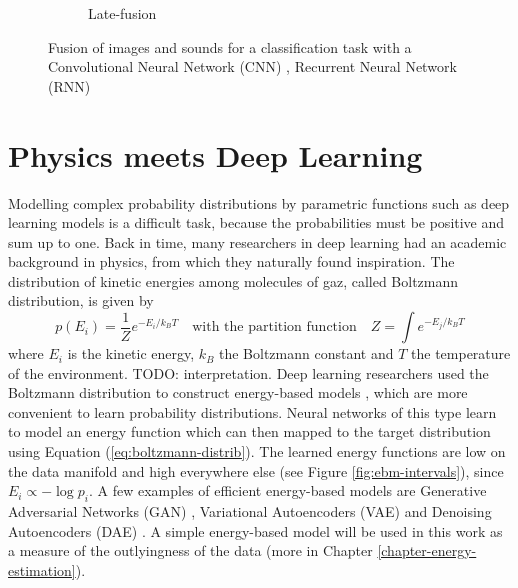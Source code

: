 \begin{figure}[!h]
\begin{subfigure}{.45\textwidth}
  \vspace*{2mm}
  \caption{Late-fusion}
  \label{fig:late-fusion}
\end{subfigure}
\caption[Early and late fusion]{Fusion of images and sounds for a classification task with a Convolutional Neural Network (CNN) \citep{image-recognition}, Recurrent Neural Network (RNN) \citep{machine-translation}}
\label{fig:fusion}
\end{figure}


\section{Physics meets Deep Learning}\label{sec:ebm}
Modelling complex probability distributions by parametric functions such as deep learning models is a difficult task, because the probabilities must be positive and sum up to one. Back in time, many researchers in deep learning had an academic background in physics, from which they naturally found inspiration. The distribution of kinetic energies among molecules of gaz, called Boltzmann distribution, is given by
\begin{equation}
p(E_i) = \frac{1}{Z}e^{-E_i/k_B T} \quad \text{with the partition function} \quad Z = \int e^{-E_j/k_B T}
\label{eq:boltzmann-distrib}
\end{equation}
where $E_i$ is the kinetic energy, $k_B$ the Boltzmann constant and $T$ the temperature of the environment. TODO: interpretation. Deep learning researchers used the Boltzmann distribution to construct energy-based models \citep{ebm-tutorial}, which are more convenient to learn probability distributions. Neural networks of this type learn to model an energy function which can then mapped to the target distribution using Equation (\ref{eq:boltzmann-distrib}). The learned energy functions are low on the data manifold and high everywhere else (see Figure \ref{fig:ebm-intervals}), since $E_i \propto -\log p_i$. A few examples of efficient energy-based models are Generative Adversarial Networks (GAN) \citep{gan}, Variational Autoencoders (VAE) \citep{kingma-vae} and Denoising Autoencoders (DAE) \citep{dae-vincent}. A simple energy-based model will be used in this work as a measure of the outlyingness of the data (more in Chapter \ref{chapter-energy-estimation}).
